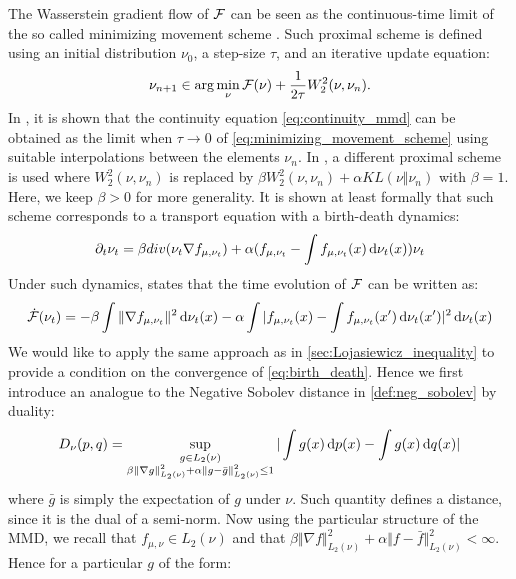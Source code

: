 The Wasserstein gradient flow of ${{\mathcal F}}$ can be seen as the continuous-time limit of the so called minimizing movement scheme \cite{ambrosio2008gradient}. Such proximal scheme is defined using an initial distribution $\nu_0$, a step-size $\tau$, and an iterative update equation:
\begin{align}\label{eq:minimizing_movement_scheme}
	\nu_{n+1} \in \arg \min _{\nu} {{\mathcal F}}(\nu) + \frac{1}{2\tau} W_2^2(\nu,\nu_n).
\end{align}
In \cite{ambrosio2008gradient}, it is shown that the continuity equation \cref{eq:continuity_mmd} can be obtained as the limit when $\tau \rightarrow 0$ of \cref{eq:minimizing_movement_scheme} using suitable interpolations between the elements $\nu_n$.
In \cite{rotskoff2019global}, a different proximal scheme is used where $W_2^2(\nu,\nu_n)$ is replaced by $\beta W_2^2(\nu,\nu_n) + \alpha KL(\nu\Vert \nu_n)$ with $\beta=1$. Here, we keep $\beta>0$ for more generality. It is shown at least formally that such scheme corresponds to a transport equation with a birth-death dynamics:
\[
\partial_t \nu_t = \beta div(\nu_t \nabla f_{\mu,\nu_t}) + \alpha(f_{\mu,\nu_t} - \int f_{\mu,\nu_t}(x)\mathop{}\!\mathrm{d} \nu_t(x) )\nu_t
\]
Under such dynamics, \cite[Proposition 3.1]{rotskoff2019global} states that the time evolution of ${{\mathcal F}}$ can be written as:
\begin{align}\label{eq:birth_death}
\dot{{{\mathcal F}}}(\nu_t) = -\beta\int \Vert \nabla f_{\mu,\nu_t}\Vert^2 \mathop{}\!\mathrm{d} \nu_t(x) -\alpha \int \vert f_{\mu,\nu_t}(x)-\int f_{\mu,\nu_t}(x')\mathop{}\!\mathrm{d} \nu_t(x')\vert^2\mathop{}\!\mathrm{d} \nu_t(x) 
\end{align}
We would like to apply the same approach as in \cref{sec:Lojasiewicz_inequality} to provide a condition on the convergence of \cref{eq:birth_death}. 
Hence we first introduce an analogue to the Negative Sobolev distance in \cref{def:neg_sobolev} by duality:
\begin{align}
	D_{\nu}(p,q) =\sup_{\substack{g\in L_2(\nu)\\ \beta \Vert \nabla g \Vert^2_{L_2(\nu)} +\alpha  \Vert g- \bar{g}  \Vert^2_{L_2(\nu)}  \leq 1 }} \vert \int g(x)\mathop{}\!\mathrm{d} p(x) - \int g(x) \mathop{}\!\mathrm{d} q(x)\vert 
\end{align}
where $\bar{g}$ is simply the expectation of $g$ under $\nu$.
Such quantity defines a distance, since it is the dual of a semi-norm. Now using the particular structure of the MMD, we recall that $f_{\mu,\nu}\in L_2(\nu)$ and that $\beta \Vert \nabla f \Vert^2_{L_2(\nu)} +\alpha  \Vert f- \bar{f}  \Vert^2_{L_2(\nu)}<\infty$. Hence for a particular $g$ of the form:
